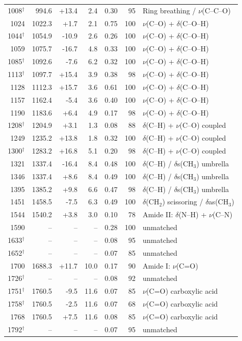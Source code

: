 \documentclass[11pt,a4paper]{article}
\begin{document}
\begin{table}[htbp]
\begin{tabular}{rrrrrrp{4.6cm}}
1008$^{\dagger}$ & 994.6 & +13.4 & 2.4 & 0.30 & 95 & Ring breathing / $\nu$(C--C--O) \\
1024 & 1022.3 & +1.7 & 2.1 & 0.75 & 100 & $\nu$(C--O) + $\delta$(C--O--H) \\
1044$^{\dagger}$ & 1054.9 & -10.9 & 2.6 & 0.26 & 100 & $\nu$(C--O) + $\delta$(C--O--H) \\
1059 & 1075.7 & -16.7 & 4.8 & 0.33 & 100 & $\nu$(C--O) + $\delta$(C--O--H) \\
1085$^{\dagger}$ & 1092.6 & -7.6 & 6.2 & 0.32 & 100 & $\nu$(C--O) + $\delta$(C--O--H) \\
1113$^{\dagger}$ & 1097.7 & +15.4 & 3.9 & 0.38 & 98 & $\nu$(C--O) + $\delta$(C--O--H) \\
1128 & 1112.3 & +15.7 & 3.6 & 0.61 & 100 & $\nu$(C--O) + $\delta$(C--O--H) \\
1157 & 1162.4 & -5.4 & 3.6 & 0.40 & 100 & $\nu$(C--O) + $\delta$(C--O--H) \\
1190 & 1183.6 & +6.4 & 4.9 & 0.17 & 98 & $\nu$(C--O) + $\delta$(C--O--H) \\
1208$^{\dagger}$ & 1204.9 & +3.1 & 1.3 & 0.08 & 88 & $\delta$(C--H) + $\nu$(C--O) coupled \\
1249 & 1235.2 & +13.8 & 1.8 & 0.32 & 100 & $\delta$(C--H) + $\nu$(C--O) coupled \\
1300$^{\dagger}$ & 1283.2 & +16.8 & 5.1 & 0.20 & 98 & $\delta$(C--H) + $\nu$(C--O) coupled \\
1321 & 1337.4 & -16.4 & 8.4 & 0.48 & 100 & $\delta$(C--H) / $\delta$s(CH$_3$) umbrella \\
1346 & 1337.4 & +8.6 & 8.4 & 0.49 & 100 & $\delta$(C--H) / $\delta$s(CH$_3$) umbrella \\
1395 & 1385.2 & +9.8 & 6.6 & 0.47 & 98 & $\delta$(C--H) / $\delta$s(CH$_3$) umbrella \\
1451 & 1458.5 & -7.5 & 6.3 & 0.49 & 100 & $\delta$(CH$_2$) scissoring / $\delta$as(CH$_3$) \\
1544 & 1540.2 & +3.8 & 3.0 & 0.10 & 78 & Amide II: $\delta$(N--H) + $\nu$(C--N) \\
1590 & -- & -- & -- & 0.28 & 100 & unmatched \\
1633$^{\dagger}$ & -- & -- & -- & 0.08 & 95 & unmatched \\
1652$^{\dagger}$ & -- & -- & -- & 0.07 & 85 & unmatched \\
1700 & 1688.3 & +11.7 & 10.0 & 0.17 & 90 & Amide I: $\nu$(C=O) \\
1726$^{\dagger}$ & -- & -- & -- & 0.08 & 92 & unmatched \\
1751$^{\dagger}$ & 1760.5 & -9.5 & 11.6 & 0.07 & 85 & $\nu$(C=O) carboxylic acid \\
1758$^{\dagger}$ & 1760.5 & -2.5 & 11.6 & 0.07 & 68 & $\nu$(C=O) carboxylic acid \\
1768 & 1760.5 & +7.5 & 11.6 & 0.08 & 85 & $\nu$(C=O) carboxylic acid \\
1792$^{\dagger}$ & -- & -- & -- & 0.07 & 95 & unmatched \\
\bottomrule
\end{tabular}
\end{table}
\end{document}
